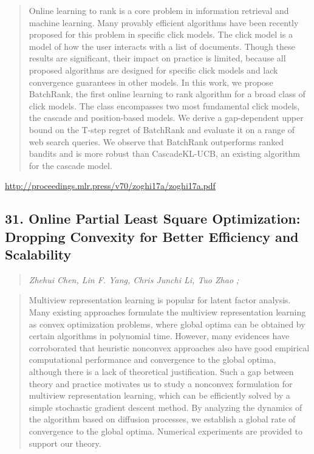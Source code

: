 \documentclass{article}
\begin{document}
\begin{quote}
    Online learning to rank is a core problem in information retrieval and machine learning. Many provably efficient algorithms have been recently proposed for this problem in specific click models. The click model is a model of how the user interacts with a list of documents. Though these results are significant, their impact on practice is limited, because all proposed algorithms are designed for specific click models and lack convergence guarantees in other models. In this work, we propose BatchRank, the first online learning to rank algorithm for a broad class of click models. The class encompasses two most fundamental click models, the cascade and position-based models. We derive a gap-dependent upper bound on the T-step regret of BatchRank and evaluate it on a range of web search queries. We observe that BatchRank outperforms ranked bandits and is more robust than CascadeKL-UCB, an existing algorithm for the cascade model.  
\end{quote}

\href{http://proceedings.mlr.press/v70/zoghi17a/zoghi17a.pdf}{http://proceedings.mlr.press/v70/zoghi17a/zoghi17a.pdf}

\subsection{31. Online Partial Least Square Optimization: Dropping Convexity for Better Efficiency and Scalability}

\begin{quote}
\footnotesize{\textit{Zhehui Chen, Lin F. Yang, Chris Junchi Li, Tuo Zhao ;}}

\end{quote}

\begin{quote}
    Multiview representation learning is popular for latent factor analysis. Many existing approaches formulate the multiview representation learning as convex optimization problems, where global optima can be obtained by certain algorithms in polynomial time. However, many evidences have corroborated that heuristic nonconvex approaches also have good empirical computational performance and convergence to the global optima, although there is a lack of theoretical justification. Such a gap between theory and practice motivates us to study a nonconvex formulation for multiview representation learning, which can be efficiently solved by a simple stochastic gradient descent method. By analyzing the dynamics of the algorithm based on diffusion processes, we establish a global rate of convergence to the global optima. Numerical experiments are provided to support our theory.  
\end{quote}
\end{document}
